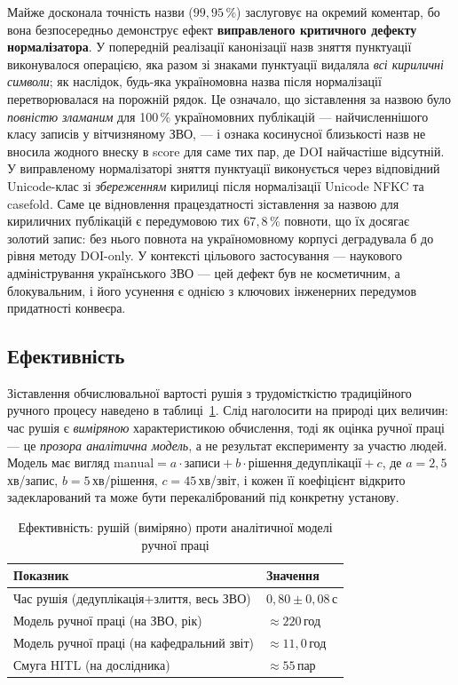 Майже досконала точність назви ($99{,}95\,\%$) заслуговує на окремий коментар, бо вона безпосередньо демонструє ефект \textbf{виправленого критичного дефекту нормалізатора}. У попередній реалізації канонізації назв зняття пунктуації виконувалося операцією, яка разом зі знаками пунктуації видаляла \textit{всі кириличні символи}; як наслідок, будь-яка україномовна назва після нормалізації перетворювалася на порожній рядок. Це означало, що зіставлення за назвою було \textit{повністю зламаним} для 100\,\% україномовних публікацій --- найчисленнішого класу записів у вітчизняному ЗВО, --- і ознака косинусної близькості назв не вносила жодного внеску в score для саме тих пар, де DOI найчастіше відсутній. У виправленому нормалізаторі зняття пунктуації виконується через відповідний Unicode-клас зі \textit{збереженням} кирилиці після нормалізації Unicode NFKC та casefold. Саме це відновлення працездатності зіставлення за назвою для кириличних публікацій є передумовою тих $67{,}8\,\%$ повноти, що їх досягає золотий запис: без нього повнота на україномовному корпусі деградувала б до рівня методу DOI-only. У контексті цільового застосування --- наукового адміністрування українського ЗВО --- цей дефект був не косметичним, а блокувальним, і його усунення є однією з ключових інженерних передумов придатності конвеєра.

\subsection*{Ефективність}

Зіставлення обчислювальної вартості рушія з трудомісткістю традиційного ручного процесу наведено в таблиці~\ref{tab:res-eff}. Слід наголосити на природі цих величин: час рушія є \textit{виміряною} характеристикою обчислення, тоді як оцінка ручної праці --- це \textit{прозора аналітична модель}, а не результат експерименту за участю людей. Модель має вигляд $\text{manual} = a \cdot \text{записи} + b \cdot \text{рішення\_дедуплікації} + c$, де $a = 2{,}5$\,хв/запис, $b = 5$\,хв/рішення, $c = 45$\,хв/звіт, і кожен її коефіцієнт відкрито задекларований та може бути перекалібрований під конкретну установу.

\begin{table}[ht]
\centering
\caption{Ефективність: рушій (виміряно) проти аналітичної моделі ручної праці}
\label{tab:res-eff}
\begin{tabular}{ll}
\toprule
Показник & Значення \\
\midrule
Час рушія (дедуплікація+злиття, весь ЗВО) & $0{,}80 \pm 0{,}08$\,с \\
Модель ручної праці (на ЗВО, рік) & $\approx 220$\,год \\
Модель ручної праці (на кафедральний звіт) & $\approx 11{,}0$\,год \\
Смуга HITL (на дослідника) & $\approx 55$\,пар \\
\bottomrule
\end{tabular}
\end{table}

